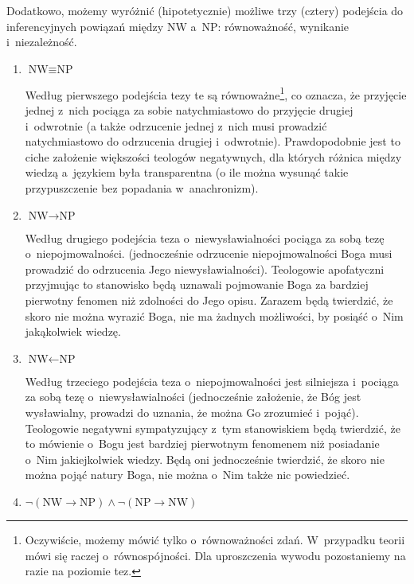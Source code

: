 Dodatkowo, możemy wyróżnić (hipotetycznie) możliwe trzy (cztery) podejścia do inferencyjnych powiązań między NW a~NP: równoważność, wynikanie i~niezależność.

\begin{enumerate}[label = \arabic*), itemindent=6mm, labelwidth=4mm, labelsep=2mm, itemsep=1em, leftmargin=0mm]
\item $\text{NW} \equiv \text{NP}$

Według pierwszego podejścia tezy te są równoważne\footnote{Oczywiście, możemy mówić tylko o~równoważności zdań. W~przypadku teorii mówi się raczej o~równospójności. Dla uproszczenia wywodu pozostaniemy na razie na poziomie tez.}, co oznacza, że przyjęcie jednej z~nich pociąga za sobie natychmiastowo do przyjęcie drugiej i~odwrotnie (a także odrzucenie jednej z~nich musi prowadzić natychmiastowo do odrzucenia drugiej i~odwrotnie). Prawdopodobnie jest to ciche założenie większości teologów negatywnych, dla których różnica między wiedzą a~językiem była transparentna (o ile można wysunąć takie przypuszczenie bez popadania w~anachronizm).

\item $\text{NW} \rightarrow \text{NP}$

Według drugiego podejścia teza o~niewysławialności pociąga za sobą tezę o~niepojmowalności. (jednocześnie odrzucenie niepojmowalności Boga musi prowadzić do odrzucenia Jego niewysławialności). Teologowie apofatyczni przyjmując to stanowisko będą uznawali pojmowanie Boga za bardziej pierwotny fenomen niż zdolności do Jego opisu. Zarazem będą twierdzić, że skoro nie można wyrazić Boga, nie ma żadnych możliwości, by posiąść o~Nim jakąkolwiek wiedzę.

\item $\text{NW} \leftarrow \text{NP}$

Według trzeciego podejścia teza o~niepojmowalności jest silniejsza i~pociąga za sobą tezę o~niewysławialności (jednocześnie założenie, że Bóg jest wysławialny, prowadzi do uznania, że można Go zrozumieć i~pojąć). Teologowie negatywni sympatyzujący z~tym stanowiskiem będą twierdzić, że to mówienie o~Bogu jest bardziej pierwotnym fenomenem niż posiadanie o~Nim jakiejkolwiek wiedzy. Będą oni jednocześnie twierdzić, że skoro nie można pojąć natury Boga, nie można o~Nim także nic powiedzieć.

\item $\neg (\text{NW} \rightarrow \text{NP}) \land \neg (\text{NP} \rightarrow \text{NW})$


\end{enumerate}
